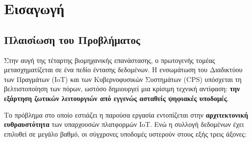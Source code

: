 \chapter{Εισαγωγή}

\section{Πλαισίωση του Προβλήματος}

%

Στην αυγή της τέταρτης βιομηχανικής επανάστασης, ο πρωτογενής τομέας
μετασχηματίζεται σε ένα πεδίο έντασης δεδομένων. Η ενσωμάτωση του Διαδικτύου
των Πραγμάτων (IoT) και των Κυβερνοφυσικών Συστημάτων (CPS) υπόσχεται τη
βελτιστοποίηση των πόρων, ωστόσο δημιουργεί μια κρίσιμη τεχνική αντίφαση:
\textbf{την εξάρτηση ζωτικών λειτουργιών από εγγενώς ασταθείς ψηφιακές
	υποδομές}.

Το πρόβλημα στο οποίο εστιάζει η παρούσα εργασία εντοπίζεται στην
\textbf{αρχιτεκτονική ευθραυστότητα} των υπαρχουσών πλατφορμών IoT. Ενώ η
συλλογή δεδομένων έχει επιλυθεί σε μεγάλο βαθμό, οι σύγχρονες υποδομές υστερούν
στους εξής τρεις άξονες:

